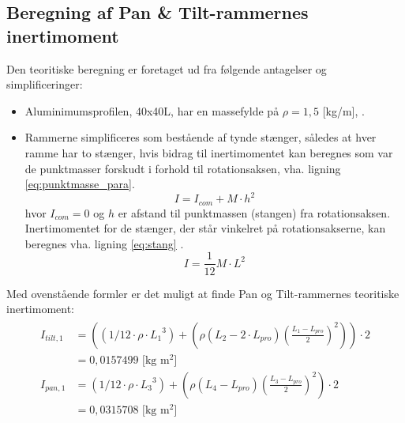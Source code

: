 \subsection{Beregning af Pan \& Tilt-rammernes inertimoment}
Den teoritiske beregning er foretaget ud fra følgende antagelser og simplificeringer:
\begin{itemize}
\item Aluminimumsprofilen, 40x40L, har en massefylde på \(\rho=1,5\) [kg/m], \citep[Kap. 2 side. 4]{alu_profil_desitet}.
\item Rammerne simplificeres som bestående af tynde stænger, således at hver ramme har to stænger, hvis bidrag
til inertimomentet kan beregnes som var de punktmasser forskudt i forhold til rotationsaksen\citep[Side. 254, ligning 10-36]{fund_of_physics},
vha. ligning \ref{eq:punktmasse_para}.
\begin{equation}
I={ I }_{ com }+M\cdot { h }^{ 2 }
\label{eq:punktmasse_para} 
\end{equation}
hvor \({I_{com}} = 0\) og \(h\) er afstand til punktmassen (stangen) fra rotationsaksen.
Inertimomentet for de stænger, der står vinkelret på rotationsakserne, kan beregnes vha. ligning \ref{eq:stang}
\citep[Side. 255, tabel 10-2e]{fund_of_physics}.
\begin{equation}
I=\frac { 1 }{ 12 } M\cdot { L }^{ 2 }
\label{eq:stang} 
\end{equation}
\end{itemize}

Med ovenstående formler er det muligt at finde Pan og Tilt-rammernes teoritiske inertimoment:
\begin{align}
\label{eq:inerti_tilt_pan}
\begin{split}
{ I }_{ tilt,1 } &= \left( \left( 1/12\cdot \rho \cdot { {L_{1}} }^{ 3 } \right) +\left( \rho \left( {L_{2}}-2\cdot {L_{pro}} \right) { \left( \frac { {L_{1}}-{L_{pro}}}{ 2 }  \right)  }^{ 2 } \right)  \right) \cdot 2
\\
 &= 0,0157499 \text{ [kg m$^2$]}
\\
{ I }_{ pan,1 }&=\left( 1/12\cdot \rho \cdot { { L }_{ 3 } }^{ 3 } \right) +\left( \rho \left( { L }_{ 4 }-{ L }_{ pro } \right) { \left( \frac { { L }_{ 3 }-{ L }_{ pro } }{ 2 }  \right)  }^{ 2 } \right) \cdot 2
\\
 &=0,0315708 \text{ [kg m$^2$]}
\end{split}
\end{align}

